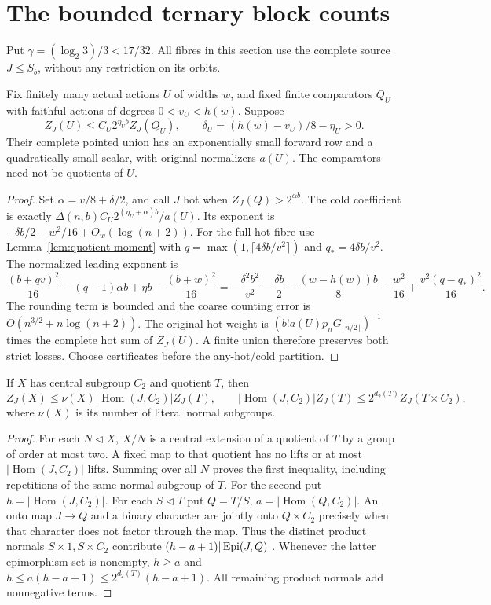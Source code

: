 \section{The bounded ternary block counts}\label{sec:bounded-ternary}
Put $\gamma=(\log_2 3)/3<17/32$. All fibres in this section use the
complete source $J\leq S_b$, without any restriction on its orbits.

\begin{lemma}\label{lem:finite-multiplicative}
Fix finitely many actual actions $U$ of widths $w$, and fixed finite
comparators $Q_U$ with faithful actions of degrees $0<v_U<h(w)$.
Suppose
\[
 Z_J(U)\leq C_U2^{\eta_Ub}Z_J(Q_U),\qquad
 \delta_U=(h(w)-v_U)/8-\eta_U>0.
\]
Their complete pointed union has an exponentially small forward row
and a quadratically small scalar, with original normalizers $a(U)$.
The comparators need not be quotients of $U$.
\end{lemma}
\begin{proof}
Set $\alpha=v/8+\delta/2$, and call $J$ hot when
$Z_J(Q)>2^{\alpha b}$. The cold coefficient is exactly
$\Delta(n,b)C_U2^{(\eta_U+\alpha)b}/a(U)$.
Its exponent is $-\delta b/2-w^2/16+O_w(\log(n+2))$.
For the full hot fibre use Lemma~\ref{lem:quotient-moment} with
$q=\max(1,\lceil4\delta b/v^2\rceil)$ and $q_*=4\delta b/v^2$.
The normalized leading exponent is
\[
 \frac{(b+qv)^2}{16}-(q-1)\alpha b+\eta b
             -\frac{(b+w)^2}{16}
 =-\frac{\delta^2b^2}{v^2}-\frac{\delta b}{2}
  -\frac{(w-h(w))b}{8}-\frac{w^2}{16}
                  +\frac{v^2(q-q_*)^2}{16}.
\]
The rounding term is bounded and the coarse counting error is
$O(n^{3/2}+n\log(n+2))$. The original hot weight is
$(b!a(U)p_nG_{\lfloor n/2\rfloor})^{-1}$ times the complete hot
sum of $Z_J(U)$. A finite union therefore preserves both strict
losses. Choose certificates before the any-hot/cold partition.
\end{proof}

\begin{lemma}\label{lem:central-comparator}
If $X$ has central subgroup $C_2$ and quotient $T$, then
\[
 Z_J(X)\leq\nu(X)|\operatorname{Hom}(J,C_2)|Z_J(T),\qquad
 |\operatorname{Hom}(J,C_2)|Z_J(T)
       \leq2^{d_2(T)}Z_J(T\times C_2),
\]
where $\nu(X)$ is its number of literal normal subgroups.
\end{lemma}
\begin{proof}
For each $N\lhd X$, $X/N$ is a central extension of a quotient of
$T$ by a group of order at most two. A fixed map to that quotient has
no lifts or at most $|\operatorname{Hom}(J,C_2)|$ lifts. Summing
over all $N$ proves the first inequality, including repetitions of
the same normal subgroup of $T$.
For the second put $h=|\operatorname{Hom}(J,C_2)|$. For each
$S\lhd T$ put $Q=T/S$, $a=|\operatorname{Hom}(Q,C_2)|$.
An onto map $J\to Q$ and a binary character are jointly onto
$Q\times C_2$ precisely when that character does not factor through
the map. Thus the distinct product normals $S\times1,S\times C_2$
contribute $(h-a+1)|\operatorname{Epi}(J,Q)|$. Whenever the latter epimorphism
set is nonempty, $h\geq a$ and
$h\leq a(h-a+1)\leq2^{d_2(T)}(h-a+1)$.
All remaining product normals add nonnegative terms.
\end{proof}

